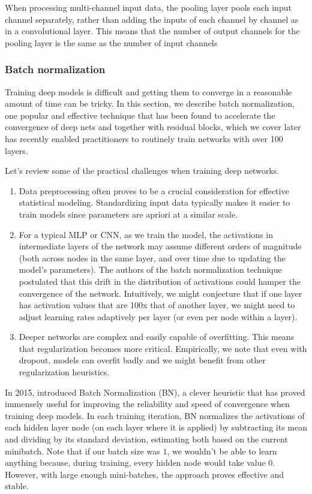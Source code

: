 When processing multi-channel input data, the pooling layer pools each input channel separately, rather than adding the inputs of each channel by channel as in a convolutional layer. This means that the number of output channels for the pooling layer is the same as the number of input channels

\subsubsection{Batch normalization}\label{subsubsec:batch-norm}

Training deep models is difficult and getting them to converge in a reasonable amount of time can be tricky. In this section, we describe batch normalization, one popular and effective technique that has been found to accelerate the convergence of deep nets and together with residual blocks, which we cover later has recently enabled practitioners to routinely train networks with over 100 layers.

Let's review some of the practical challenges when training deep networks.

\begin{enumerate}
    \item Data preprocessing often proves to be a crucial consideration for effective statistical modeling. Standardizing input data typically makes it easier to train models since parameters are apriori at a similar scale.
    \item For a typical MLP or CNN, as we train the model, the activations in intermediate layers of the network may assume different orders of magnitude (both across nodes in the same layer, and over time due to updating the model's parameters). The authors of the batch normalization technique postulated that this drift in the distribution of activations could hamper the convergence of the network. Intuitively, we might conjecture that if one layer has activation values that are 100x that of another layer, we might need to adjust learning rates adaptively per layer (or even per node within a layer).
    \item Deeper networks are complex and easily capable of overfitting. This means that regularization becomes more critical. Empirically, we note that even with dropout, models can overfit badly and we might benefit from other regularization heuristics.
\end{enumerate}

In 2015, \cite{Ioffe2015} introduced Batch Normalization (BN), a clever heuristic that has proved immensely useful for improving the reliability and speed of convergence when training deep models. In each training iteration, BN normalizes the activations of each hidden layer node (on each layer where it is applied) by subtracting its mean and dividing by its standard deviation, estimating both based on the current minibatch. Note that if our batch size was $1$,  we wouldn't be able to learn anything because, during training, every hidden node would take value $0$. However, with large enough mini-batches, the approach proves effective and stable.

